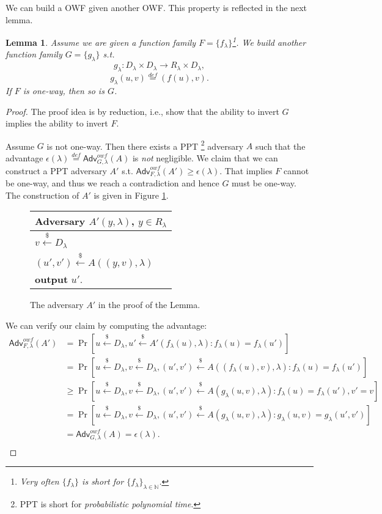 \documentclass[12pt]{article}
\newcommand{\eqdef}{\stackrel{def}{=}}
\newcommand{\N}{\mathbb{N}}
\newcommand{\getsr}{\stackrel{\$}{\gets}}
\newcommand{\Adv}{\textsf{Adv}}
\newtheorem{lemma}[theorem]{Lemma}
\theoremstyle{definition}
\begin{document}
We can build a OWF given another OWF. This property is reflected in the next lemma.
\begin{lemma}
Assume we are given a function family $F = \{f_\lambda\}$\footnote{Very often $ \{f_\lambda\}$ is short for $ \{f_\lambda\}_{\lambda\in\N}$.}.
We build another function family $G = \{g_\lambda\}$ s.t.
$$g_\lambda : D_\lambda \times D_\lambda \to R_\lambda \times D_\lambda,$$
$$g_\lambda(u,v) \eqdef (f(u), v).$$
If $F$ is one-way, then so is $G$.
\end{lemma}
\begin{proof}
The proof idea is by reduction, i.e., show that the ability to invert $G$ implies the ability to invert $F$.

Assume $G$ is not one-way. Then there exists a PPT \footnote{PPT is short for \emph{probabilistic polynomial time}.} adversary $A$ such that the advantage $\epsilon(\lambda) \eqdef \Adv_{G,\lambda}^{owf}(A)$ is \emph{not} negligible. We claim that we can construct a PPT adversary $A'$ s.t. $\Adv_{F,\lambda}^{owf}(A') \geq \epsilon(\lambda)$. That implies $F$ cannot be one-way, and thus we reach a contradiction and hence $G$ must be one-way. The construction of $A'$ is given in Figure \ref{fig:ad}.

\begin{figure}[!ht]
\centering
\begin{tabular}{l}
Adversary $A'(y,\lambda)$, $y\in R_\lambda$\\
\hline
$v \getsr D_\lambda$ \\
$(u',v') \getsr A((y,v),\lambda)$ \\
{\bf output} $u'$.\\
\end{tabular}
\caption{The adversary $A'$ in the proof of the Lemma.}
\label{fig:ad}
\end{figure}

We can verify our claim by computing the advantage:
$$
\begin{aligned}
\Adv_{F,\lambda}^{owf} (A') 
&= \Pr [u\getsr D_\lambda, u'\getsr A'(f_\lambda(u), \lambda) : f_\lambda(u) = f_\lambda(u')] \\
&= \Pr [u\getsr D_\lambda, v\getsr D_\lambda, (u', v')\getsr A((f_\lambda(u), v), \lambda) : f_\lambda(u) = f_\lambda(u')] \\
&\geq \Pr [u\getsr D_\lambda, v\getsr D_\lambda, (u', v')\getsr A(g_\lambda(u, v), \lambda) : f_\lambda(u) = f_\lambda(u'), v' = v] \\
&= \Pr [u\getsr D_\lambda, v\getsr D_\lambda, (u', v')\getsr A(g_\lambda(u, v), \lambda) : g_\lambda(u, v) = g_\lambda(u', v')] \\
&= \Adv_{G,\lambda}^{owf}(A) = \epsilon(\lambda). \\
\end{aligned}
$$
\end{proof}
\end{document}
